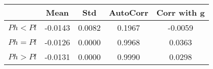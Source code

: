 \begin{tiny}\begin{tabular}{|l|c|c|c|c|}
\hline
&\textbf{Mean}&\textbf{Std}&\textbf{AutoCorr}&\textbf{Corr with g}\\\hline
\textbf{$Ph<Pl$}&-0.0143&0.0082&0.1967&-0.0059\\\hline
\textbf{$Ph=Pl$}&-0.0126&0.0000&0.9968&0.0363\\\hline
\textbf{$Ph>Pl$}&-0.0131&0.0000&0.9990&0.0298\\\hline
\end{tabular}
\end{tiny}